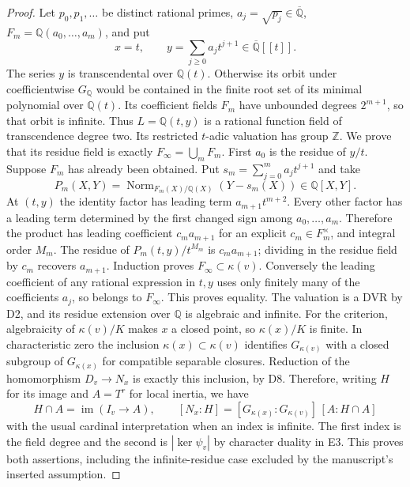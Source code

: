 \begin{proof}
Let $p_0,p_1,\ldots$ be distinct rational primes, $a_j=\sqrt{p_j}\in\overline{\mathbb Q}$, $F_m=\mathbb Q(a_0,\ldots,a_m)$, and put
\[
 x=t,\qquad y=\sum_{j\ge0}a_jt^{j+1}\in\overline{\mathbb Q}[[t]].
\]
The series $y$ is transcendental over $\mathbb Q(t)$. Otherwise its orbit under coefficientwise $G_{\mathbb Q}$ would be contained in the finite root set of its minimal polynomial over $\mathbb Q(t)$. Its coefficient fields $F_m$ have unbounded degrees $2^{m+1}$, so that orbit is infinite. Thus $L=\mathbb Q(t,y)$ is a rational function field of transcendence degree two. Its restricted $t$-adic valuation has group $\mathbb Z$.
We prove that its residue field is exactly $F_\infty=\bigcup_mF_m$. First $a_0$ is the residue of $y/t$. Suppose $F_m$ has already been obtained. Put $s_m=\sum_{j=0}^ma_jt^{j+1}$ and take
\[
 P_m(X,Y)=\operatorname{Norm}_{F_m(X)/\mathbb Q(X)}(Y-s_m(X))\in\mathbb Q[X,Y].
\]
At $(t,y)$ the identity factor has leading term $a_{m+1}t^{m+2}$. Every other factor has a leading term determined by the first changed sign among $a_0,\ldots,a_m$. Therefore the product has leading coefficient $c_ma_{m+1}$ for an explicit $c_m\in F_m^\times$, and integral order $M_m$. The residue of $P_m(t,y)/t^{M_m}$ is $c_ma_{m+1}$; dividing in the residue field by $c_m$ recovers $a_{m+1}$. Induction proves $F_\infty\subset\kappa(v)$. Conversely the leading coefficient of any rational expression in $t,y$ uses only finitely many of the coefficients $a_j$, so belongs to $F_\infty$. This proves equality. The valuation is a DVR by D2, and its residue extension over $\mathbb Q$ is algebraic and infinite.
For the criterion, algebraicity of $\kappa(v)/K$ makes $x$ a closed point, so $\kappa(x)/K$ is finite. In characteristic zero the inclusion $\kappa(x)\subset\kappa(v)$ identifies $G_{\kappa(v)}$ with a closed subgroup of $G_{\kappa(x)}$ for compatible separable closures. Reduction of the homomorphism $D_v\to N_x$ is exactly this inclusion, by D8. Therefore, writing $H$ for its image and $A=T^r$ for local inertia, we have
\[
 H\cap A=\operatorname{im}(I_v\to A),\qquad
 [N_x:H]=[G_{\kappa(x)}:G_{\kappa(v)}]\,[A:H\cap A]
\]
with the usual cardinal interpretation when an index is infinite. The first index is the field degree and the second is $|\ker\psi_v|$ by character duality in E3. This proves both assertions, including the infinite-residue case excluded by the manuscript's inserted assumption.
\end{proof}
